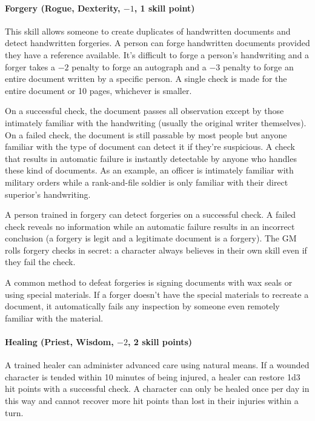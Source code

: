 \begin{multicols}{2}
\paragraph{Forgery (Rogue, Dexterity, $-1$, 1 skill point)}

This skill allows someone to create duplicates of handwritten documents and detect handwritten forgeries.  A person can forge handwritten documents provided they have a reference available.  It's difficult to forge a person's handwriting and a forger takes a $-2$ penalty to forge an autograph and a $-3$ penalty to forge an entire document written by a specific person.  A single check is made for the entire document or 10 pages, whichever is smaller.

On a successful check, the document passes all observation except by those intimately familiar with the handwriting (usually the original writer themselves).  On a failed check, the document is still passable by most people but anyone familiar with the type of document can detect it if they're suspicious.  A check that results in automatic failure is instantly detectable by anyone who handles these kind of documents.  As an example, an officer is intimately familiar with military orders while a rank-and-file soldier is only familiar with their direct superior's handwriting.

A person trained in forgery can detect forgeries on a successful check.  A failed check reveals no information while an automatic failure results in an incorrect conclusion (a forgery is legit and a legitimate document is a forgery).  The GM rolls forgery checks in secret: a character always believes in their own skill even if they fail the check.

A common method to defeat forgeries is signing documents with wax seals or using special materials.  If a forger doesn't have the special materials to recreate a document, it automatically fails any inspection by someone even remotely familiar with the material.

\paragraph{Healing (Priest, Wisdom, $-2$, 2 skill points)}

A trained healer can administer advanced care using natural means.  If a wounded character is tended within 10 minutes of being injured, a healer can restore 1d3 hit points with a successful check.  A character can only be healed once per day in this way and cannot recover more hit points than lost in their injuries within a turn.  


\end{multicols}
